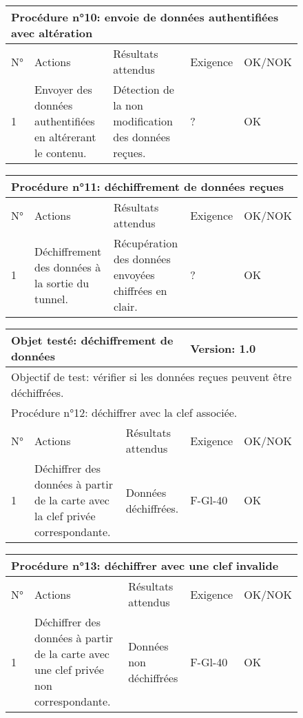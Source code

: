 \documentclass[a4paper,11pt,french]{article}
\begin{document}
\begin{figure}[!h]
\begin{tabular}{|p{1cm}|p{5cm}|p{5cm}|p{2cm}|p{2cm}|}
\hline
\multicolumn{5}{|l|}{Procédure n°10: envoie de données authentifiées avec altération} \\
\hline
N° & Actions & Résultats attendus & Exigence & OK/NOK \\
\hline
1 & Envoyer des données authentifiées en altérerant le contenu. & Détection de la non modification des données reçues. & ? & OK \\
\hline
\end{tabular}
\end{figure}


\begin{figure}[!h]
\begin{tabular}{|p{1cm}|p{5cm}|p{5cm}|p{2cm}|p{2cm}|}
\hline
\multicolumn{5}{|l|}{Procédure n°11: déchiffrement de données reçues} \\
\hline
N° & Actions & Résultats attendus & Exigence & OK/NOK \\
\hline
1 & Déchiffrement des données à la sortie du tunnel. & Récupération des données envoyées chiffrées en clair. & ? & OK \\
\hline
\end{tabular}
\end{figure}


\begin{figure}[!h]
\begin{tabular}{|p{1cm}|p{5cm}|p{5cm}|p{2cm}|p{2cm}|}
\hline
\multicolumn{3}{|l|}{Objet testé: déchiffrement de données} & \multicolumn{2}{|l|}{Version: 1.0} \\
\hline
\multicolumn{5}{|l|}{Objectif de test: vérifier si les données reçues peuvent être déchiffrées.} \\
\hline
\multicolumn{5}{|l|}{Procédure n°12: déchiffrer avec la clef associée.} \\
\hline
N° & Actions & Résultats attendus & Exigence & OK/NOK \\
\hline
1 & Déchiffrer des données à partir de la carte avec la clef privée correspondante. & Données déchiffrées. & F-Gl-40 & OK \\
\hline
\end{tabular}
\end{figure}



\begin{figure}[!h]
\begin{tabular}{|p{1cm}|p{5cm}|p{5cm}|p{2cm}|p{2cm}|}
\hline
\multicolumn{5}{|l|}{Procédure n°13: déchiffrer avec une clef invalide} \\
\hline
N° & Actions & Résultats attendus & Exigence & OK/NOK \\
\hline
1 & Déchiffrer des données à partir de la carte avec une clef privée non correspondante. & Données non déchiffrées & F-Gl-40 & OK \\
\hline
\end{tabular}
\end{figure}
\end{document}
